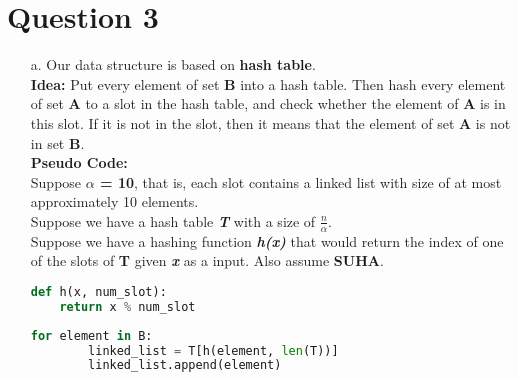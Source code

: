 \documentclass[10pt]{article}
\begin{document}
\section*{Question 3}
\begin{enumerate}
\item[a.] Our data structure is based on \textbf{hash table}.\\
\textbf{Idea:} Put every element of set \textbf{B} into a hash table. Then hash every element of set \textbf{A} to a
slot in the hash table, and check whether the element of \textbf{A} is in this slot. If it is not in the slot, then it means that the element of set \textbf{A} is not in set \textbf{B}.\\
\textbf{Pseudo Code:}\\
Suppose \textbf{$\alpha$ = 10}, that is, each slot contains a linked list with size of at most approximately 10 elements.\\
Suppose we have a hash table \textbf{\textit{T}} with a size of $\frac{n}{\alpha}$.\\
Suppose we have a hashing function \textit{\textbf{h(x)}} that would return the index of one of the slots of \textbf{T} given \textbf{\textit{x}} as a input. Also assume \textbf{SUHA}.
\begin{lstlisting}[language=Python]
def h(x, num_slot):
	return x % num_slot
\end{lstlisting}
\begin{lstlisting}[language=Python]
for element in B:
		linked_list = T[h(element, len(T))]
		linked_list.append(element)
		

\end{lstlisting}
\end{enumerate}
\end{document}
